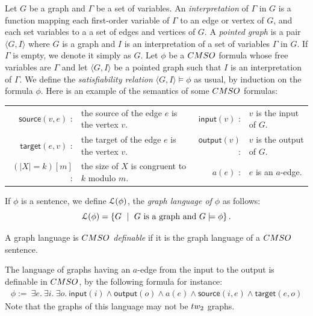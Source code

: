 \begin{definition} Let $G$ be a graph and $\Gamma$ be a set of variables. An \emph{interpretation} of $\Gamma$ in $G$ is a function mapping each first-order variable of $\Gamma$ to an edge or vertex of $G$, and each set variables to a a set of edges and vertices of $G$. A \emph{pointed graph} is a pair  $\langle G,I\rangle$ where $G$ is a graph and $I$ is an interpretation of a set of variables $\Gamma$ in $G$. If $\Gamma$ is empty, we denote it simply as $G$.   Let $\phi$ be a $\CMSO$ formula whose free variables are $\Gamma$ and let $\langle G,I\rangle$ be a pointed graph such that $I$ is an interpretation of $\Gamma$.  We define the \emph{satisfiability relation} $\langle G, I\rangle\models \phi$ as usual, by induction on the formula $\phi$. Here is an example of the semantics of some $\CMSO$ formulas:
\medskip

\noindent \begin{tabular}{rlrl}
$\mathsf{source}(v,e)$ :& the source of the edge $e$ is the vertex $v$.\quad\qquad & $\mathsf{input}(v)$ : & $v$ is the input of $G$.\\
$\mathsf{target}(e,v)$ :& the target of the edge $e$ is the vertex $v$. &
$\mathsf{output}(v)$ : & $v$ is the output of $G$.\\
$(|X|=k)[m]$ :& the size of $X$ is congruent to $k$ modulo $m$.& $a(e)$ :  &  $e$ is an $a$-edge.  \\[7pt]
\end{tabular}
If $\phi$ is a sentence, we define $\mathcal L(\phi)$, the \emph{graph language of $\phi$} as  follows:
$$\mathcal L(\phi)=\left\{G \ \mid\ G \text{ is a graph and } G\models\phi\right\}.$$
\end{definition}

\begin{definition}\label{def:CMSO-def}
A graph language is \emph{$\CMSO$ definable} if it is the graph language of  a $\CMSO$ sentence. 
\end{definition}

\begin{example} \label{ex:mso-def}The language of graphs having an $a$-edge
from the input to the output is definable in $\CMSO$, by the following formula for instance:
\begin{align*}
\phi:=\ \exists e.\ \exists i.\ \exists o.\ \mathsf{input}(i) \wedge \mathsf{output}(o)
\wedge a(e) \wedge \mathsf{source}(i, e) \wedge \mathsf{target}(e, o)
\end{align*}
Note that the graphs of this language may not be $\TWT$ graphs. 
\end{example}

